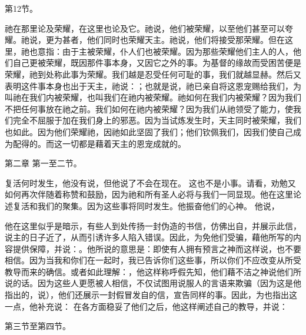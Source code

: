 第12节。 \par

祂在那里论及荣耀，在这里也论及它。祂说，他们被荣耀，以至他们甚至可以夸耀。祂说，更为甚者，他们同时也荣耀天主。祂说，他们将接受那荣耀。但在这里，祂也意指：由于主被荣耀，仆人们也被荣耀。因为那些荣耀他们主人的人，他们自己更被荣耀，既因那件事本身，又因它之外的事。为基督的缘故而受困苦便是荣耀，祂到处称此事为荣耀。我们越是忍受任何可耻的事，我们就越显赫。然后又表明这件事本身也出于天主，祂说：；也就是说，祂已亲自将这恩宠赐给我们，为叫祂在我们内被荣耀，也叫我们在祂内被荣耀。祂如何在我们内被荣耀？因为我们不把任何事放在祂之前。我们如何在祂内被荣耀？因为我们从祂领受了能力，使我们完全不屈服于加在我们身上的邪恶。因为当试炼发生时，天主同时被荣耀，我们也如此。因为他们荣耀祂，因祂如此坚固了我们；他们钦佩我们，因我们使自己成为配得的。而这一切都是藉着天主的恩宠成就的。\par

第二章 第一至二节。\par

复活何时发生，他没有说，但他说了不会在现在。 这也不是小事。请看，劝勉又如何再次伴随着称赞和鼓励，因为祂和所有圣人必将与我们一同显现。他在这里论述复活和我们的聚集。因为这些事将同时发生。他振奋他们的心神。 他说，\par

他在这里似乎是暗示，有些人到处传扬一封伪造的书信，仿佛出自，并展示此信，说主的日子近了，从而引诱许多人陷入错误。因此，为免他们受骗，藉他所写的内容提供保障，并说：。他所说的意思是：即使有人拥有预言之神而这样说，也不要相信。因为当我和你们在一起时，我已告诉你们这些事，所以你们不应改变从所受教导而来的确信。或者如此理解：，他这样称呼假先知，他们藉不洁之神说他们所说的话。因为这些人更愿被人相信，不仅试图用说服人的言语来欺骗（因为这是他指出的，说），他们还展示一封假冒发自的信，宣告同样的事。因此，为也指出这一点，他补充说： 在各方面稳妥了他们之后，他这样阐述自己的教导，并说：\par

第三节至第四节。\par

